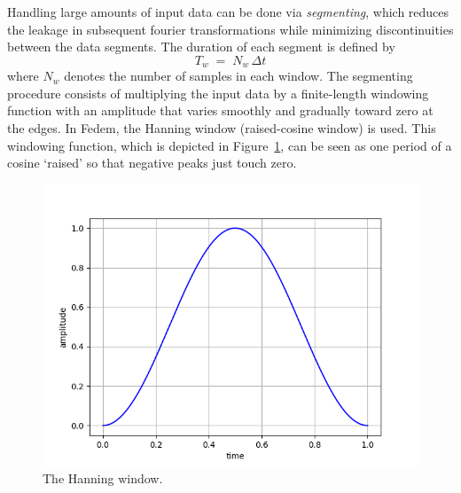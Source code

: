 Handling large amounts of input data can be done via {\it segmenting},
which reduces the leakage in subsequent fourier transformations
while minimizing discontinuities between the data segments.
The duration of each segment is defined by
%
\begin{equation}
\label{eq:wtime}
T_w \;=\; N_w\,\Delta t
\end{equation}
%
where $N_w$ denotes the number of samples in each window.
The segmenting procedure consists of multiplying the input data by a
finite-length windowing function with an amplitude that varies smoothly and
gradually toward zero at the edges.
In Fedem, the Hanning window (raised-cosine window) is used.
This windowing function, which is depicted in Figure~\ref{fig:Hanning}, can be
seen as one period of a cosine `raised' so that negative peaks just touch zero.
%
\begin{figure}[b]
\includegraphics[width=\textwidth]{Figures/hanning300}
\caption{The Hanning window.}
\label{fig:Hanning}
\end{figure}


